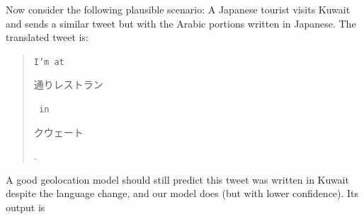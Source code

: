 \documentclass[sigconf,anonymous,review]{acmart}
\newcommand{\str}[1]{\texttt{#1}}
\begin{document}
\begin{description}
Now consider the following plausible scenario:
A Japanese tourist visits Kuwait and sends a similar tweet but with the Arabic portions written in Japanese.
The translated tweet is:
\begin{quote}
\str{I'm at }\begin{CJK}{UTF8}{min}通りレストラン\end{CJK}\str{ in }\begin{CJK}{UTF8}{min}クウェート\end{CJK}.
\end{quote}
A good geolocation model should still predict this tweet was written in Kuwait despite the language change,
and our model does (but with lower confidence).
Its output is

\noindent


\end{description}
\end{document}
